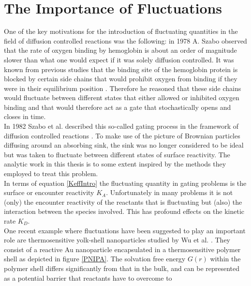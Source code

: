 \section{The Importance of Fluctuations}
One of the key motivations for the introduction of fluctuating quantities in the field of diffusion controlled reactions was the following: in 1978 A. Szabo \cite{Szabo1978} observed that the rate of oxygen binding by hemoglobin is about an order of magnitude slower than what one would expect if it was solely diffusion controlled. It was known from previous studies that the binding site of the hemoglobin protein is blocked by certain side chains that would prohibit oxygen from binding if they were in their equilibrium position \cite{perutz1966x, muirhead1967structure}. Therefore he reasoned that these side chains would fluctuate between different states that either allowed or inhibited oxygen binding and that would therefore act as a gate that stochastically opens and closes in time. \\ In 1982 Szabo et al. described this so-called gating process in the framework of diffusion controlled reactions \cite{Szabo1982}. To make use of the  picture of Brownian particles diffusing around an absorbing sink, the sink was no longer considered to be ideal but was taken to fluctuate between different states of surface reactivity. The analytic work in this thesis is to some extent inspired by the methods they employed to treat this problem. \\
In terms of equation \eqref{KeffIntro} the fluctuating quantity in gating problems is the surface or encounter reactivity $K_A$. Unfortunately in many problems it is not (only) the encounter reactivity of the reactants that is fluctuating but (also) the interaction between the species involved. This has profound effects on the kinetic rate $K_D$. \\
One recent example where fluctuations have been suggested to play an important role are thermosensitive yolk-shell nanoparticles studied by Wu et al. \cite{Wu2012a}. They consist of a reactive Au nanoparticle encapsulated in a thermosensitive polymer shell as depicted in figure \ref{PNIPA}. The solvation free energy $G(r)$ within the polymer shell differs significantly from that in the bulk, and can be represented as a potential barrier that reactants have to overcome to  \\[.2 cm]

